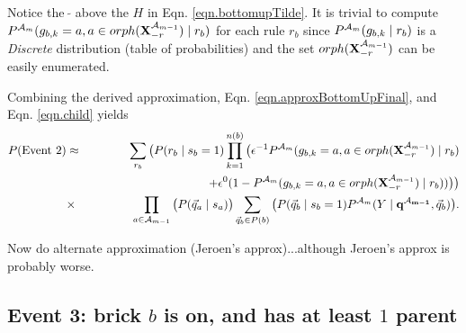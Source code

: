 \documentclass[11pt]{article}
\newcommand{\A}{{\cal A}}
\newcommand{\X}{\mathbf{X}}
\newcommand{\XrmPrev}{\X^{\A_{m-1}}_{-r}}
\newcommand{\Am}{\A_{m}}
\newcommand{\qb}{\vec{q}_b}
\newcommand{\qa}{\vec{q}_a}
\begin{document}
Notice the $~\tilde{}$ above the $H$ in Eqn. \ref{eqn.bottomupTilde}. It is trivial to compute $P^{\Am}(g_{b,k} = a, a \in orph(\XrmPrev) \mid r_b)$ for each rule $r_b$ since $P^{\Am}(g_{b,k} \mid r_b)$ is a \emph{Discrete} distribution (table of probabilities) and the set $orph(\XrmPrev)$ can be easily enumerated.

Combining the derived approximation, Eqn. \ref{eqn.approxBottomUpFinal}, and Eqn. \ref{eqn.child} yields
%
\begin{eqnarray}
P(\text{Event 2}) &\approx& \sum_{r_b} \big( P(r_b \mid s_b = 1) \prod_{k=1}^{n(b)} \big ( \epsilon^{-1}P^{\Am}(g_{b,k} = a, a \in orph(\XrmPrev) \mid r_b) \\ 
& & \qquad \qquad \qquad \qquad \qquad + \epsilon^{0}(1-P^{\Am}(g_{b,k} = a, a \in orph(\XrmPrev) \mid r_b)) \big) \big) \nonumber \\
%
&\times& \prod_{a \in {\A_{m-1}}} \big( P(\qa \mid s_a) \big) \sum_{\vec{q}_b \in P(b)} \big( P(\qb \mid s_b = 1) P^{\Am}(Y \mid \mathbf{q^{\A_{m-1}}}, \vec{q}_b) \big). \nonumber
\end{eqnarray} 

Now do alternate approximation (Jeroen's approx)...although Jeroen's approx is probably worse.

\subsection*{Event 3: brick $b$ is on, and has at least $1$ parent}



\end{document}
